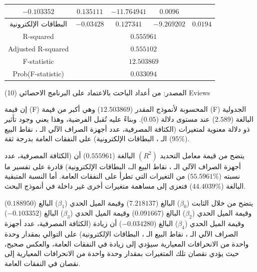 \documentclass[10pt,a4paper]{report}
\begin{document}
\begin{doublespacing}
\begin{table}[H]
{\begin{tabular}{|ccccc|}
	\multicolumn{1}{c|}{$-0.103352$} & 
	\multicolumn{1}{c|}{$0.135111$} & 
	\multicolumn{1}{c|}{$-11.764941$} & 
	$0.0096$ \\ \hline
	\multicolumn{1}{|c|}{البطاقات الإلكترونية} & 
	\multicolumn{1}{c|}{$-0.03428$} & 
	\multicolumn{1}{c|}{$0.127341$} & 
	\multicolumn{1}{c|}{$-9.269202$} & 
	$0.0194$ \\ \hline
	\multicolumn{1}{|c|}{\textenglish{R-squared}}             & \multicolumn{4}{c|}{$0.555961$}  \\ \hline
	\multicolumn{1}{|c|}{\textenglish{Adjusted R-squared}}    & \multicolumn{4}{c|}{$0.555102$}  \\ \hline
	\multicolumn{1}{|c|}{\textenglish{F-statistic}}           & \multicolumn{4}{c|}{$12.503869$} \\ \hline
	\multicolumn{1}{|c|}{\textenglish{Prob(F-statistic)}}     & \multicolumn{4}{c|}{$0.033094$}  \\ \hline
\end{tabular}
		}
	\end{table}
المصدر: من أعداد الباحث بالاعتماد على البرنامج الاحصائي (10) Eviews

إن قيمة (F) المحسوبة لأنموذج المقدر ($12.503869$) وهي أكبر من قيمة (F) الجدولية البالغة ($2.589$) عند مستوى دلالة ($0.05$). وبناءً عليه تُقبل الفرضية، وهذا يعني وجود تأثير ذو دلالة معنوية لمتغيرات ({الكثافة المصرفية، عدد أجهزة الصراف الآلي الـ ، نقاط البيع الـ ، البطاقات الإلكترونية}) على النفقات العامة بدرجة ثقة ($95\%$).

يتضح من قيمة معامل التحديد $(R^2)$ البالغة ($0.555961$) أن ({الكثافة المصرفية، عدد أجهزة الصراف الآلي الـ ، نقاط البيع الـ، البطاقات الإلكترونية}) قادرة على تفسير ما نسبته ($55.5961\%$) من التغيرات التي تطرأ على النفقات العامة. أما النسبة المتبقية البالغة ($44.4039\%$) فتعزى إلى مساهمة متغيرات أخرى غير داخلة في أنموذج البحث.

يتضح من خلال الثابت (\(\beta_0\)) البالغ ($7.218137$) وقيمة الميل الحدي (\(\beta_1\)) البالغ ($0.188950$) وقيمة الميل الحدي (\(\beta_2\)) البالغ ($0.091667$) وقيمة الميل الحدي (\(\beta_3\)) البالغ ($-0.103352$) وقيمة الميل الحدي (\(\beta_4\)) البالغ ($-0.034280$) أن زيادة ({الكثافة المصرفية، عدد أجهزة الصراف الآلي الـ ، نقاط البيع الـ ، البطاقات الإلكترونية}) على التوالي بمقدار وحدة واحدة من الانحرافات المعيارية سيؤدي إلى زيادة في النفقات العامة، والعكس صحيح، حيث يؤدي نقصان تلك المتغيرات بمقدار وحدة واحدة من الانحرافات المعيارية إلى نقصان في النفقات العامة.


\end{doublespacing}
\end{document}
